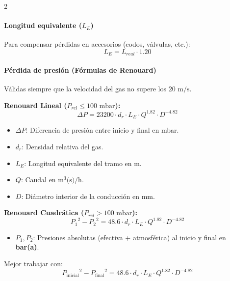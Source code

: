 \documentclass[11pt]{article}
\begin{document}
\begin{multicols*}{2}
    \paragraph*{Longitud equivalente ($L_E$)}
    Para compensar pérdidas en accesorios (codos, válvulas, etc.):
    \begin{equation}
        L_E = L_{real} \cdot 1.20
    \end{equation}

    \paragraph*{Pérdida de presión (Fórmulas de Renouard)}
    Válidas siempre que la velocidad del gas no supere los $20 \text{ m/s}$.

    \textbf{Renouard Lineal ($P_{rel} \leq 100 \text{ mbar}$):}
    \begin{equation}
        \Delta P = 23200 \cdot d_r \cdot L_E \cdot Q^{1.82} \cdot D^{-4.82}
    \end{equation}
    \begin{itemize}
        \item $\Delta P$: Diferencia de presión entre inicio y final en mbar.
        \item $d_r$: Densidad relativa del gas.
        \item $L_E$: Longitud equivalente del tramo en m.
        \item $Q$: Caudal en $\text{m}^3\text{(s)/h}$.
        \item $D$: Diámetro interior de la conducción en mm.
    \end{itemize}

    \textbf{Renouard Cuadrática ($P_{rel} > 100 \text{ mbar}$):}
    \begin{equation}
        {P_1}^2 - {P_2}^2 = 48.6 \cdot d_r \cdot L_E \cdot Q^{1.82} \cdot D^{-4.82}
    \end{equation}
    \begin{itemize}
        \item $P_1, P_2$: Presiones absolutas (efectiva + atmosférica) al inicio y final en \textbf{bar(a)}.
    \end{itemize}

    Mejor trabajar con:
    \begin{equation}
        {P_{\text{inicial}}}^2 - {P_{\text{final}}}^2 = 48.6 \cdot d_r \cdot L_E \cdot Q^{1.82} \cdot D^{-4.82}
    \end{equation}


\end{multicols*}
\end{document}
